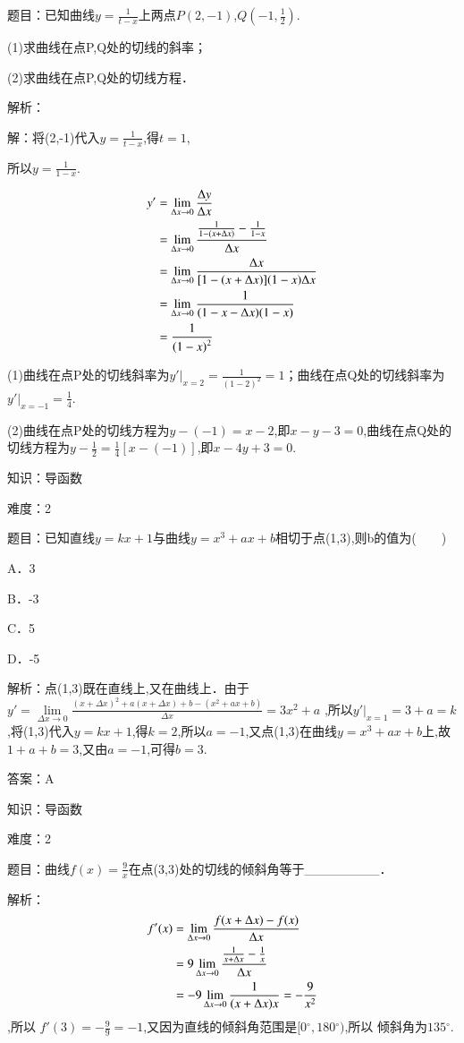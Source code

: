\documentclass{article} %
\begin{document}
题目：已知曲线$y=\frac{1}{t-x}$上两点$P(2,-1)$,$Q(-1,\frac{1}{2})$.

(1)求曲线在点P,Q处的切线的斜率；

(2)求曲线在点P,Q处的切线方程．

解析：

解：将(2,-1)代入$y=\frac{1}{t-x}$,得$t=1$,

所以$y=\frac{1}{1-x}$.

\begin{align}
\notag
y'&=\lim\limits_{\Delta x \rightarrow 0}\frac{\Delta y}{\Delta x}\\\notag
&=\lim\limits_{\Delta x \rightarrow 0}\frac{\frac{1}{1-(x+\Delta x)}-\frac{1}{1-x}}{\Delta x}\\\notag
&=\lim\limits_{\Delta x \rightarrow 0}\frac{\Delta x}{[1-(x+\Delta x)](1-x)\Delta x}\\\notag
&=\lim\limits_{\Delta x \rightarrow 0}\frac{1}{(1-x-\Delta x)(1-x)}\\\notag
&=\frac{1}{{(1-x)}^2}
\end{align}

(1)曲线在点P处的切线斜率为$y'|_{x=2}=\frac{1}{{(1-2)}^2}=1$；曲线在点Q处的切线斜率为$y'|_{x=-1}=\frac{1}{4}$.

(2)曲线在点P处的切线方程为$y-(-1)=x-2$,即$x-y-3=0$,曲线在点Q处的切线方程为$y-\frac{1}{2}=\frac{1}{4}[x-(-1)]$,即$x-4y+3=0$.



知识：导函数

难度：2

题目：已知直线$y=kx+1$与曲线$y=x^{3}+ax+b$相切于点(1,3),则b的值为(　　)

A．3  

B．-3  

C．5  

D．-5

解析：点(1,3)既在直线上,又在曲线上．由于
$y'=\lim\limits_{\Delta x\rightarrow 0}\frac{{(x+\Delta x)}^2+a(x+\Delta x)+b-(x^2+ax+b)}{\Delta x}=3x^2+a$
,所以$y'|_{x=1}=3+a=k$,将(1,3)代入$y=kx+1$,得$k=2$,所以$a=-1$,又点(1,3)在曲线$y=x^{3}+ax+b$上,故$1+a+b=3$,又由$a=-1$,可得$b=3$.

答案：A



知识：导函数

难度：2

题目：曲线$f(x)=\frac{9}{x}$在点(3,3)处的切线的倾斜角等于\_\_\_\_\_\_\_\_．

解析：
\begin{align}
\notag
f'(x)&=\lim\limits_{\Delta x\rightarrow 0}\frac{f(x+\Delta x)-f(x)}{\Delta x}\\\notag
&=9\lim\limits_{\Delta x\rightarrow 0}\frac{\frac{1}{x+\Delta x}-\frac{1}{x}}{\Delta x}\\\notag
&=-9\lim\limits_{\Delta x\rightarrow 0}\frac{1}{(x+\Delta x)x}=-\frac{9}{x^2}
\end{align}
,所以 $f'(3)=-\frac{9}{9}=-1$,又因为直线的倾斜角范围是$[0{{}^\circ},180{{}^\circ})$,所以 倾斜角为$135{{}^\circ}$.
\end{document}
